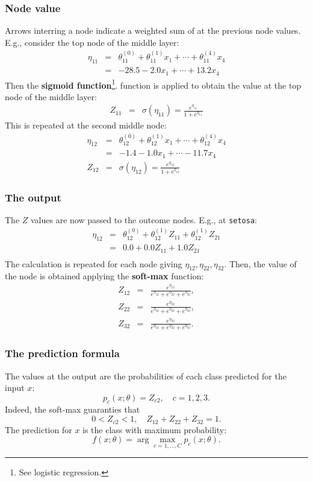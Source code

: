 \begin{frame}
\frametitle{Node value}
Arrows interring a node indicate a weighted sum of at the previous node values. E.g., consider the top node of the middle layer:
\begin{eqnarray*}
\eta_{11} &=& \theta_{11}^{(0)} + \theta_{11}^{(1)} x_1 + \cdots + \theta_{11}^{(4)} x_4\\
&=& -28.5 -2.0 x_1 + \cdots + 13.2 x_4
\end{eqnarray*}
Then the {\bf sigmoid function}\footnote{See logistic regression.}. function is applied to obtain the value at the top node of the middle layer:
\begin{eqnarray*}
Z_{11} &=& \sigma(\eta_{11}) = \frac{e^{\eta_{11}}}{1+e^{\eta_{11}}}
\end{eqnarray*}
This is repeated at the second middle node:
\begin{eqnarray*}
\eta_{12} &=& \theta_{12}^{(0)} + \theta_{12}^{(1)} x_1 + \cdots + \theta_{12}^{(4)} x_4\\
&=& -1.4 -1.0 x_1 + \cdots - 11.7 x_4\\
Z_{12} &=& \sigma(\eta_{12}) = \frac{e^{\eta_{12}}}{1+e^{\eta_{12}}}
\end{eqnarray*}
\end{frame}
\begin{frame}
\frametitle{The output}
The $Z$ values are now passed to the outcome nodes. E.g., at {\tt setosa}:
\begin{eqnarray*}
\eta_{12} &=& \theta_{12}^{(0)} + \theta_{12}^{(1)} Z_{11} + \theta_{12}^{(1)} Z_{21} \\
 &=& 0.0 + 0.0 Z_{11} + 1.0 Z_{21} \\
\end{eqnarray*}
The calculation is repeated for each node giving $\eta_{12}, \eta_{22}, \eta_{32}$. Then, the value of the node is obtained applying the {\bf soft-max} function:
\begin{eqnarray*}
Z_{12} &=& \frac{e^{\eta_{12}}}{e^{\eta_{12}}+e^{\eta_{22}}+e^{\eta_{32}}},\\
Z_{22} &=& \frac{e^{\eta_{22}}}{e^{\eta_{12}}+e^{\eta_{22}}+e^{\eta_{32}}},\\
Z_{32} &=& \frac{e^{\eta_{32}}}{e^{\eta_{12}}+e^{\eta_{22}}+e^{\eta_{32}}}.
\end{eqnarray*}
\end{frame}
\begin{frame}
\frametitle{The prediction formula}
The values at the output are the probabilities of each class predicted for the input $x$:
$$
p_c(x;\theta) = Z_{c2}, \quad c=1,2,3.
$$
Indeed, the soft-max guaranties that
$$
0 < Z_{c2} < 1, \quad Z_{12}+Z_{22}+Z_{32} = 1.
$$
The prediction for $x$ is the class with maximum probability:
$$
f(x;\theta) = \arg \max_{c=1,\ldots,C} p_c(x;\theta).
$$
\end{frame}
